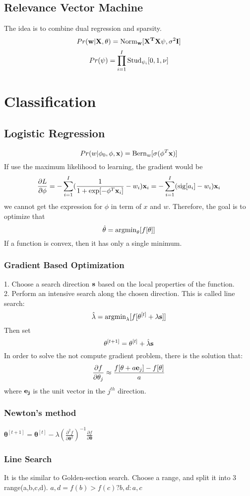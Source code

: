 \documentclass[12pt,a4paper]{article}
\begin{document}
\subsection*{Relevance Vector Machine}
The idea is to combine dual regression and sparsity.
$$
Pr({\bf w|X,\theta}) = {\rm Norm}_{\bf w}[{\bf X^TX\psi},\sigma^2{\bf I}] 
$$$$
Pr(\psi) = \prod_{i=1}^{I}{\rm Stud}_{\psi_i}[0,1,\nu]
$$
\section*{Classification}
\subsection*{Logistic Regression}
$$
Pr(w|\phi_0,\phi,{\bf x}) = {\rm Bern}_w[\sigma(\phi^T{\bf x})]
$$
If use the maximum likelihood to learning, the gradient would be 
$$
\frac{\partial L}{\partial \phi} = -\sum_{i=1}^{I}(\frac{1}{1+\exp[-\phi^T{\bf x}_i]}-w_i){\bf x}_i=-\sum_{i=1}^{I}({\rm sig}[a_i]-w_i){\bf x}_i
$$
we cannot get the expression for $\phi$ in term of $x$ and $w$.
Therefore, the goal is to optimize that
$$
\hat \theta = {\rm argmin}_\theta[f[\theta]]
$$
If a function is \large{convex}, then it has only a single minimum.\\
\subsubsection*{Gradient Based Optimization}
1. Choose a search direction $\bf s$ based on the local properties of the function. \\
2. Perform an intensive search along the chosen direction. This is called line search:
$$
\hat \lambda = {\rm argmin}_{\lambda}[f[\theta^{[t]}+\lambda{\bf s}]]
$$
Then set
$$
\theta^{[t+1]} = \theta^{[t]}+\hat \lambda{\bf s}
$$
In order to solve the not compute gradient problem, there is the solution that:
$$
\frac{\partial f}{\partial\theta_j} \approx \frac{f[\theta+a{\bf e}_j]-f[\theta]}{a}
$$
where $\bf e_j$ is the unit vector in the $j^{th}$ direction.
\subsubsection*{Newton's method}
${\boldsymbol \theta}^{[t+1]} = {\boldsymbol \theta}^{[t]}-\lambda(\frac{\partial^2f}{\partial{\boldsymbol \theta}^2})^{-1}\frac{\partial f}{\partial {\boldsymbol \theta}}$\\
\subsubsection*{Line Search}
It is the similar to Golden-section search. Choose a range, and split it into 3 range(a,b,c,d). $a,d = f(b)>f(c)?b,d:a,c$
\end{document}
